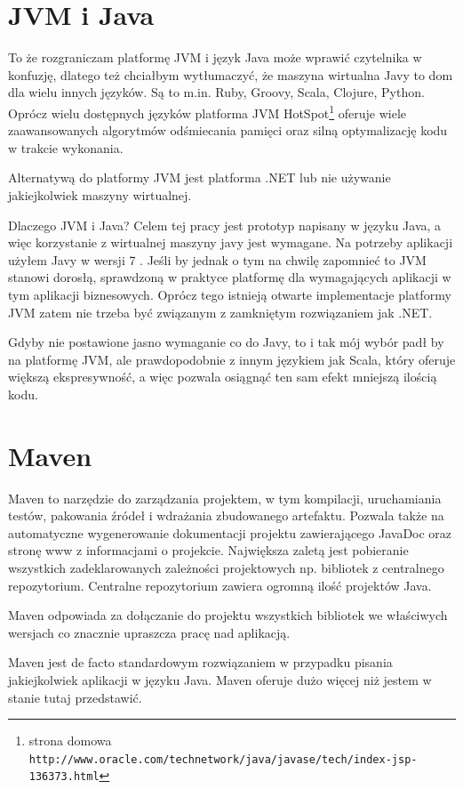 \documentclass[a4paper,onecolumn,oneside,11pt,wide,floatssmall]{mwrep}
\def\url#1{{ \tt #1}}
\theoremstyle{definition}
\theoremstyle{plain}%
\theoremstyle{remark}
\begin{document}
\section{JVM i Java}
To że rozgraniczam platformę JVM i język Java może wprawić czytelnika w konfuzję, dlatego też chciałbym wytłumaczyć, 
że maszyna wirtualna Javy to dom dla wielu innych języków. Są to m.in. Ruby, Groovy, Scala, Clojure, Python. 
Oprócz wielu dostępnych języków platforma JVM HotSpot\footnote{strona domowa \url{http://www.oracle.com/technetwork/java/javase/tech/index-jsp-136373.html}} oferuje wiele zaawansowanych algorytmów odśmiecania pamięci oraz silną optymalizację kodu w trakcie wykonania.

Alternatywą do platformy JVM jest platforma .NET lub nie używanie jakiejkolwiek maszyny wirtualnej.

Dlaczego JVM i Java? Celem tej pracy jest prototyp napisany w języku Java, a więc korzystanie z wirtualnej maszyny 
javy jest wymagane. Na potrzeby aplikacji użyłem Javy w wersji 7 \cite{java7seHome}.
Jeśli by jednak o tym na chwilę zapomnieć to JVM stanowi dorosłą, sprawdzoną w praktyce platformę dla wymagających 
aplikacji w tym aplikacji biznesowych. Oprócz tego istnieją otwarte implementacje platformy JVM zatem nie trzeba być 
związanym z zamkniętym rozwiązaniem jak .NET.

Gdyby nie postawione jasno wymaganie co do Javy, to i tak mój wybór padł by na platformę JVM, ale prawdopodobnie z 
innym językiem jak Scala\cite{scalaLangHome}, który oferuje większą ekspresywność, a więc pozwala osiągnąć ten sam efekt mniejszą ilością kodu.

\section{Maven}
Maven to narzędzie do zarządzania projektem, w tym kompilacji, uruchamiania testów, pakowania źródeł i wdrażania 
zbudowanego artefaktu. Pozwala także na automatyczne wygenerowanie dokumentacji projektu zawierającego JavaDoc oraz 
stronę www z informacjami o projekcie. Największa zaletą jest pobieranie wszystkich zadeklarowanych zależności 
projektowych np. bibliotek z centralnego repozytorium. Centralne repozytorium zawiera ogromną ilość projektów Java. 

Maven odpowiada za dołączanie do projektu wszystkich bibliotek we właściwych wersjach co znacznie 
upraszcza pracę nad aplikacją.  

Maven jest de facto standardowym rozwiązaniem w przypadku pisania jakiejkolwiek aplikacji w języku Java. Maven oferuje dużo więcej niż jestem w stanie tutaj przedstawić.
\end{document}
